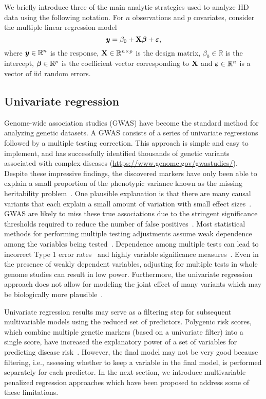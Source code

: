 We briefly introduce three of the main analytic strategies used to analyze HD data using the following notation. For $n$ observations and $p$ covariates, consider the multiple linear regression model 
\begin{equation}
\textbf{\emph{y}} = \beta_0 + \textbf{X} \boldsymbol{\beta} + \boldsymbol{\varepsilon}, \label{eq:mult_linear}
\end{equation}
where $\textbf{\emph{y}} \in \mathbb{R}^n$ is the response, $\textbf{X} \in \mathbb{R}^{n \times p}$ is the design matrix, $\beta_0 \in \mathbb{R}$ is the intercept, $\boldsymbol{\beta} \in \mathbb{R}^p$ is the coefficient vector corresponding to $\textbf{X}$ and $\boldsymbol{\varepsilon} \in \mathbb{R}^n$ is a vector of iid random errors.


\subsection{Univariate regression} \label{sec:single}

Genome-wide association studies (GWAS) have become the standard method for analyzing genetic datasets. A GWAS consists of a series of univariate regressions followed by a multiple testing correction. 
This approach is simple and easy to implement, and has successfully identified thousands of genetic variants associated with complex diseases (\url{https://www.genome.gov/gwastudies/}). 
Despite these impressive findings, the discovered markers have only been able to explain a small proportion of the phenotypic variance known as the missing heritability problem~\citep{manolio2009finding}.
One plausible explanation is that there are many causal variants that each explain a small amount of variation with small effect sizes~\citep{yang2010common}.
GWAS are likely to miss these true associations due to the stringent significance thresholds required to reduce the number of false positives~\citep{manolio2009finding}.
Most statistical methods for performing multiple testing adjustments assume weak dependence among the variables being tested~\citep{leek2008general}. 
Dependence among multiple tests can lead to incorrect Type 1 error rates~\citep{lin2013test} and highly variable significance measures~\citep{leek2008general}. 
Even in the presence of weakly dependent variables, adjusting for multiple tests in whole genome studies can result in low power. 
Furthermore, the univariate regression approach does not allow for modeling the joint effect of many variants which may be biologically more plausible~\citep{schadt2009molecular}. 

Univariate regression results may serve as a filtering step for subsequent multivariable models using the reduced set of predictors. 
Polygenic risk scores, which combine multiple genetic markers (based on a univariate filter) into a single score, have increased the explanatory power of a set of variables for predicting disease risk~\citep{dudbridge2013power}.   
However, the final model may not be very good because filtering, i.e., assessing whether to keep a variable in the final model, is performed separately for each predictor.
In the next section, we introduce multivariable penalized regression approaches which have been proposed to address some of these limitations. 




